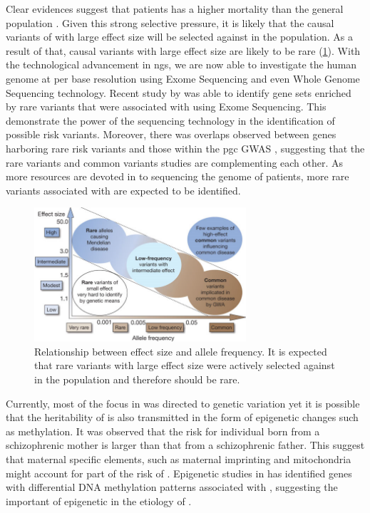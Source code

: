 \documentclass[12pt]{book}
\newcommand*{\glng}{\glsentrylong}
\begin{document}
	Clear evidences suggest that \glng{scz} patients has a higher mortality than the general population \citep{Saha2007}.
	Given this strong selective pressure, it is likely that the causal variants of \glng{scz} with large effect size will be selected against in the population. 
	As a result of that, causal variants with large effect size are likely to be rare (\cref{fig:effectSize}).
	With the technological advancement in \gls{ngs}, we are now able to investigate the human genome at per base resolution using Exome Sequencing and even Whole Genome Sequencing technology.
	Recent study by \citet{Purcell2014} was able to identify gene sets enriched by rare variants that were associated with \glng{scz} using Exome Sequencing. 
	This demonstrate the power of the sequencing technology in the identification of possible risk variants. 
	Moreover, there was overlaps observed between genes harboring rare risk variants and those within the \gls{pgc} \glng{scz} \gls{GWAS} \citep{Purcell2014}, suggesting that the rare variants and common variants studies are complementing each other.
	As more resources are devoted in to sequencing the genome of \glng{scz} patients, more rare variants associated with \glng{scz} are expected to be identified.
	\begin{figure}
		\centering
		\includegraphics[width=0.7\textwidth]{figure/maf_effectSize.png}
		\caption[Relationship between Effect Size and Allele Frequency]{
			Relationship between effect size and allele frequency. 
			It is expected that rare variants with large effect size were actively selected against in the population and therefore should be rare.
		}
		\label{fig:effectSize}
	\end{figure}
	
	Currently, most of the focus in \glng{scz} was directed to genetic variation yet it is possible that the heritability of \glng{scz} is also transmitted in the form of epigenetic changes such as methylation.
	It was observed that the risk for individual born from a schizophrenic mother is larger than that from a schizophrenic father. 
	This suggest that maternal specific elements, such as maternal imprinting and mitochondria might account for part of the risk of \glng{scz}. 
	Epigenetic studies in \glng{scz} \citep{Wockner2014,Nishioka2012} has identified genes with differential DNA methylation patterns associated with \glng{scz}, suggesting the important of epigenetic in the etiology of \glng{scz}.
	
\end{document}
